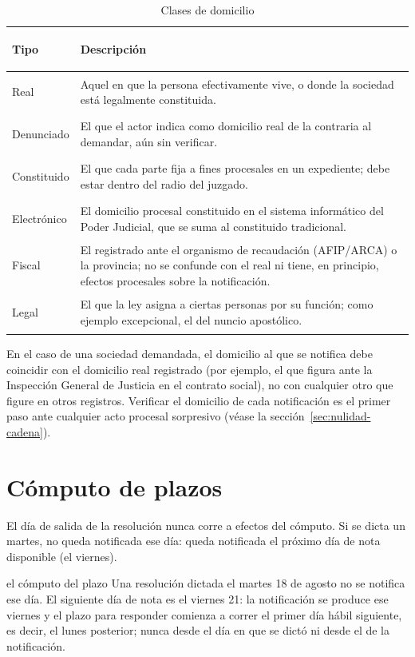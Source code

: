 \documentclass[12pt,oneside]{book}
\begin{document}
\begin{table}[H]
\centering
\caption{Clases de domicilio}
\begin{tabularx}{\textwidth}{>{\bfseries\raggedright\arraybackslash}p{} X}
\toprule
Tipo & Descripción \\
\midrule
Real & Aquel en que la persona efectivamente vive, o donde la sociedad está legalmente constituida. \\
Denunciado & El que el actor indica como domicilio real de la contraria al demandar, aún sin verificar. \\
Constituido & El que cada parte fija a fines procesales en un expediente; debe estar dentro del radio del juzgado. \\
Electrónico & El domicilio procesal constituido en el sistema informático del Poder Judicial, que se suma al constituido tradicional. \\
Fiscal & El registrado ante el organismo de recaudación (AFIP/ARCA) o la provincia; no se confunde con el real ni tiene, en principio, efectos procesales sobre la notificación. \\
Legal & El que la ley asigna a ciertas personas por su función; como ejemplo excepcional, el del nuncio apostólico. \\
\bottomrule
\end{tabularx}
\end{table}

\begin{importante}
En el caso de una sociedad demandada, el domicilio al que se notifica debe coincidir con el domicilio real registrado (por ejemplo, el que figura ante la Inspección General de Justicia en el contrato social), no con cualquier otro que figure en otros registros. Verificar el domicilio de cada notificación es el primer paso ante cualquier acto procesal sorpresivo (véase la sección~\ref{sec:nulidad-cadena}).
\end{importante}

\section{Cómputo de plazos}

El día de salida de la resolución nunca corre a efectos del cómputo. Si se dicta un martes, no queda notificada ese día: queda notificada el próximo día de nota disponible (el viernes).

\begin{ejemplo}{el cómputo del plazo}
Una resolución dictada el martes 18 de agosto no se notifica ese día. El siguiente día de nota es el viernes 21: la notificación se produce ese viernes y el plazo para responder comienza a correr el primer día hábil siguiente, es decir, el lunes posterior; nunca desde el día en que se dictó ni desde el de la notificación.
\end{ejemplo}
\end{document}
